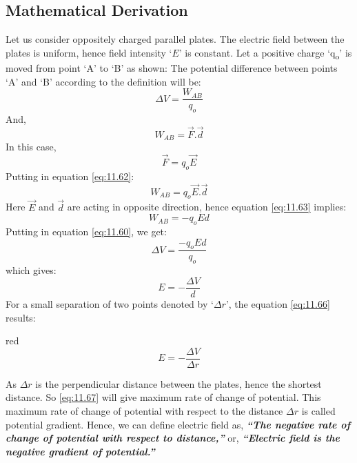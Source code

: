 \subsection*{Mathematical Derivation}
Let us consider oppositely charged parallel plates.
The electric field between the plates is uniform, hence field intensity
`$E$' is constant. Let a positive charge ‘q\textsubscript{o}’ is moved
from point ‘A’ to ‘B’ as shown:
The potential difference between points ‘A’ and ‘B’ according to the
definition will be:
\begin{equation}\label{eq:11.60}
  \Delta V = \frac{W_{AB}}{q_{o}}  
\end{equation}
And,
\begin{equation}\label{eq:11.61}
  W_{AB} = \vec{F}.\vec{d} 
\end{equation}
In this case, 
\begin{equation}\label{eq:11.62}
  \vec{F} = q_{o}\vec{E}
\end{equation}
Putting in equation \ref{eq:11.62}:
\begin{equation}\label{eq:11.63}
  W_{AB} = q_{o}\vec{E}.\vec{d} 
\end{equation}
Here $\vec{E}$ and $\vec{d}$ are acting in opposite direction, hence equation
\ref{eq:11.63} implies:
\begin{equation}\label{eq:11.64}
  W_{AB} = -q_{o}Ed 
\end{equation}
Putting in equation \ref{eq:11.60}, we get:
\begin{equation}\label{eq:11.65}
  \Delta V = \frac{-q_{o}Ed}{q_{o}}  
\end{equation}
which gives:
\begin{equation}\label{eq:11.66}
  E = -\frac{\Delta V}{d}
\end{equation}
For a small separation of two points denoted by `$\Delta r$', the
equation \ref{eq:11.66} results:
\begin{mybox}{red}{}
\begin{equation}\label{eq:11.67}
  E = -\frac{\Delta V}{\Delta r}
\end{equation}
\end{mybox}
As $\Delta r$ is the perpendicular distance between the plates, hence the
shortest distance. So \ref{eq:11.67} will give maximum rate of change of potential.
This maximum rate of change of potential with respect to the distance $\Delta r$
is called potential gradient. Hence, we can define electric field as,
\textit{\textbf{“The negative rate of change of potential with respect
to distance,”}} or, \textit{\textbf{“Electric field is the negative gradient of potential.”}}

